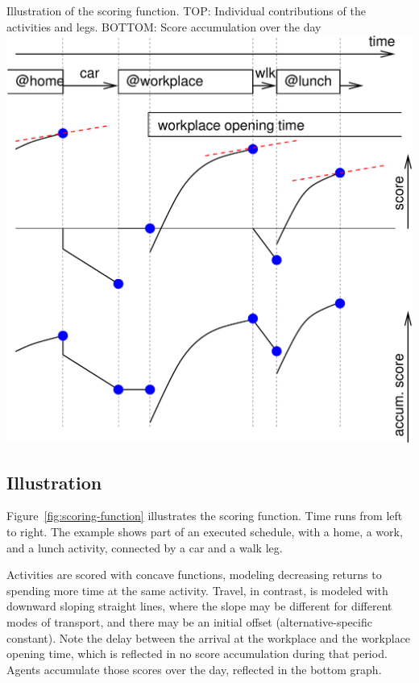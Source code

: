 %
{Illustration of the scoring function. TOP: Individual contributions of the activities and legs.  BOTTOM: Score accumulation over the day 
}%
{\label{fig:scoring-function}}%
{\includegraphics[width=0.8\hsize,trim=0 0 0 0,clip]{using/figures/scoring-example}}%
{}

\subsection{Illustration}
\label{sec:utl-fct-illustration}
Figure~\ref{fig:scoring-function} illustrates the scoring function.  Time runs from left to right.  The example shows part of an executed schedule, with a home, a work, and a lunch activity, connected by a car and a walk leg.

Activities are scored with concave functions, modeling decreasing returns to spending more time at the same activity.  Travel, in contrast, is modeled with downward sloping straight lines, where the slope may be different for different modes of transport, and there may be an initial offset (alternative-specific constant).  Note the delay between the arrival at the workplace and the workplace opening time, which is reflected in no score accumulation during that period.  Agents accumulate those scores over the day, reflected in the bottom graph.

